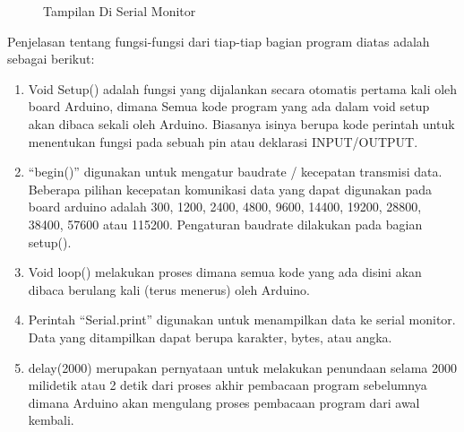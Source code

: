 \begin{enumerate}
\begin{figure}[H]
\caption{Tampilan Di Serial Monitor}
\label{print}
\end{figure}
\par Penjelasan tentang fungsi-fungsi dari tiap-tiap bagian program diatas adalah sebagai berikut:
\begin{enumerate}
    \item Void Setup()  adalah fungsi yang dijalankan secara otomatis pertama kali oleh board Arduino, dimana Semua kode program yang ada dalam void setup akan dibaca sekali oleh Arduino. Biasanya isinya berupa kode perintah untuk menentukan fungsi pada sebuah pin atau deklarasi INPUT/OUTPUT.
    \item “begin()” digunakan untuk mengatur baudrate / kecepatan transmisi data. Beberapa pilihan kecepatan komunikasi data yang dapat digunakan pada board arduino adalah 300, 1200, 2400, 4800, 9600, 14400, 19200, 28800, 38400, 57600 atau 115200. Pengaturan baudrate dilakukan pada bagian setup().
    \item Void loop() melakukan proses dimana semua kode yang ada disini akan dibaca berulang kali (terus menerus) oleh Arduino.
    \item Perintah “Serial.print” digunakan untuk menampilkan data ke serial monitor. Data yang ditampilkan dapat berupa karakter, bytes, atau angka.
    \item delay(2000) merupakan pernyataan untuk melakukan penundaan selama 2000 milidetik atau 2 detik dari proses akhir pembacaan program sebelumnya dimana Arduino akan mengulang proses pembacaan program dari awal kembali.
\end{enumerate}
\end{enumerate}

